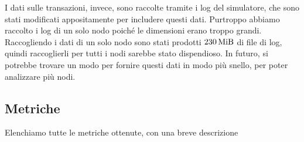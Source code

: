 \documentclass[12pt, a4paper]{article}
\begin{document}
I dati sulle transazioni, invece, sono raccolte tramite i log del simulatore, che sono stati modificati appositamente per includere questi dati.
Purtroppo abbiamo raccolto i log di un solo nodo poiché le dimensioni erano troppo grandi. Raccogliendo i dati di un solo nodo sono stati prodotti $\qty{230}{\mebi\byte}$ di file di log, quindi raccoglierli per tutti i nodi sarebbe stato dispendioso.
In futuro, si potrebbe trovare un modo per fornire questi dati in modo più snello, per poter analizzare più nodi.

\subsection{Metriche}

Elenchiamo tutte le metriche ottenute, con una breve descrizione
\end{document}
